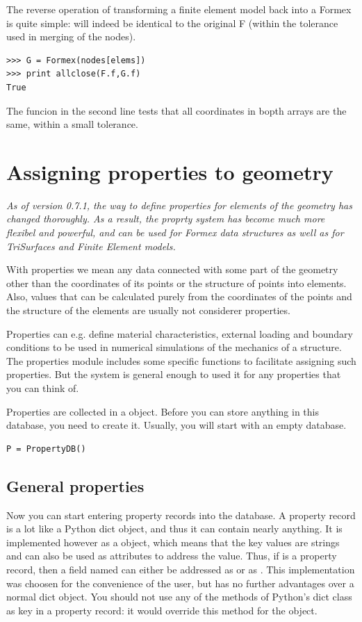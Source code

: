 The reverse operation of transforming a finite element model back into a Formex is quite simple:  will indeed be identical to the original F (within the tolerance used in merging of the nodes).

\begin{verbatim}
>>> G = Formex(nodes[elems])
>>> print allclose(F.f,G.f)
True
\end{verbatim}
The  funcion in the second line tests that all coordinates
in bopth arrays are the same, within a small tolerance.


\section{Assigning properties to geometry}
\label{sec:props}
\emph{As of version 0.7.1, the way to define properties for elements of the geometry has changed thoroughly. As a result, the proprty system has become much more flexibel and powerful, and can be used for Formex data structures as well as for TriSurfaces and Finite Element models.}

With properties we mean any data connected with some part of the geometry other than the coordinates of its points or the structure of points into elements.
Also, values that can be calculated purely from the coordinates of the points and the structure of the elements are usually not considerer properties.

Properties can e.g. define material characteristics, external loading and boundary conditions to be used in numerical simulations of the mechanics of a structure. The properties module includes some specific functions to facilitate assigning such properties. But the system is general enough to used it for any properties that you can think of.

Properties are collected in a  object. Before you can store anything in this database, you need to create it. Usually, you will start with an empty database.
\begin{verbatim}
P = PropertyDB()
\end{verbatim}

\subsection{General properties}
\label{sec:general-properties}

Now you can start entering property records into the database. A property record is a lot like a Python dict object, and thus it can contain nearly anything. It is implemented however as a  object, which means that the key values are strings and can also be used as attributes to address the value. Thus, if  is a property record, then a field named  can either be addressed as  or as . This implementation was choosen for the convenience of the user, but has no further advantages over a normal dict object. You should not use any of the methods of Python's dict class as key in a property record: it would override this method for the object.

